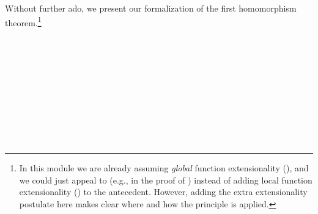 Without further ado, we present our formalization of the first homomorphism theorem.\footnote{%
In this module we are already assuming \emph{global} function extensionality (), and we could just appeal to  (e.g., in the proof of ) instead of adding local function extensionality () to the antecedent.  However, adding the extra extensionality postulate here makes clear where and how the principle is applied.}
\ccpad
\begin{code}%
\>[0]\AgdaSpace{}%
\AgdaModule{\AgdaUnderscore{}}%
\>[31I]\AgdaSymbol{\{}\AgdaSpace{}%
\AgdaSpace{}%
\AgdaSymbol{:}\AgdaSpace{}%
\AgdaSymbol{\}}\<%
\\
\>[.][@{}l@{}]\<[31I]%
\>[9]\<%
\\
\>[9][@{}l@{\AgdaIndent{0}}]%
\>[12]\AgdaSymbol{(}\AgdaSpace{}%
\AgdaSymbol{:}\AgdaSpace{}%
\AgdaSpace{}%
\AgdaSpace{}%
\AgdaSymbol{)}\<%
\\
%
\>[12]\AgdaSymbol{(}\AgdaSpace{}%
\AgdaSymbol{:}\AgdaSpace{}%
\AgdaSpace{}%
\AgdaSpace{}%
\AgdaSymbol{)}\<%
\\
%
\\[\AgdaEmptyExtraSkip]%
%
\>[9]\AgdaSymbol{(}\AgdaSpace{}%
\AgdaSymbol{:}\AgdaSpace{}%
\AgdaSpace{}%
\AgdaSpace{}%
\AgdaSymbol{)(}\AgdaSpace{}%
\AgdaSymbol{:}\AgdaSpace{}%
\AgdaSpace{}%
\AgdaSpace{}%
\AgdaSymbol{)(}\AgdaSpace{}%
\AgdaSymbol{:}\AgdaSpace{}%
\AgdaSpace{}%
\AgdaSpace{}%
\AgdaSymbol{)}\<%
\\
%
\\[\AgdaEmptyExtraSkip]%
%
\>[9]\<%
\\
\>[9][@{}l@{\AgdaIndent{0}}]%
\>[12]\AgdaSymbol{(}\AgdaSpace{}%
\AgdaSymbol{:}\AgdaSpace{}%
\AgdaSpace{}%
\AgdaSpace{}%
\AgdaSpace{}%
\AgdaSymbol{)}\<%
\\
%
\>[12]\AgdaSymbol{(}\AgdaSpace{}%
\AgdaSymbol{:}\AgdaSpace{}%
\AgdaSpace{}%
\AgdaSpace{}%
\AgdaSpace{}%
\AgdaSpace{}%
\AgdaSpace{}%

\end{code}
